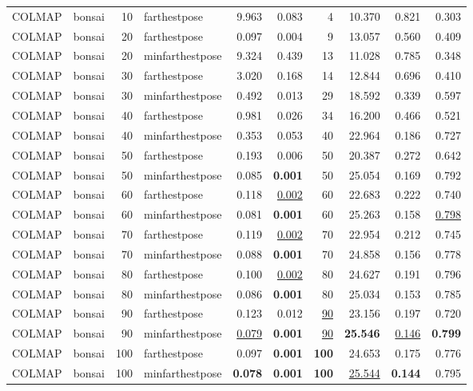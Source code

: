 \begin{table}[H]
\begin{tabular}{llrlrrrrrr}
\midrule
COLMAP & bonsai & 10 & farthestpose & 9.963 & 0.083 & 4 & 10.370 & 0.821 & 0.303 \\
COLMAP & bonsai & 20 & farthestpose & 0.097 & 0.004 & 9 & 13.057 & 0.560 & 0.409 \\
COLMAP & bonsai & 20 & minfarthestpose & 9.324 & 0.439 & 13 & 11.028 & 0.785 & 0.348 \\
COLMAP & bonsai & 30 & farthestpose & 3.020 & 0.168 & 14 & 12.844 & 0.696 & 0.410 \\
COLMAP & bonsai & 30 & minfarthestpose & 0.492 & 0.013 & 29 & 18.592 & 0.339 & 0.597 \\
COLMAP & bonsai & 40 & farthestpose & 0.981 & 0.026 & 34 & 16.200 & 0.466 & 0.521 \\
COLMAP & bonsai & 40 & minfarthestpose & 0.353 & 0.053 & 40 & 22.964 & 0.186 & 0.727 \\
COLMAP & bonsai & 50 & farthestpose & 0.193 & 0.006 & 50 & 20.387 & 0.272 & 0.642 \\
COLMAP & bonsai & 50 & minfarthestpose & 0.085 & \textbf{0.001} & 50 & 25.054 & 0.169 & 0.792 \\
COLMAP & bonsai & 60 & farthestpose & 0.118 & \underline{0.002} & 60 & 22.683 & 0.222 & 0.740 \\
COLMAP & bonsai & 60 & minfarthestpose & 0.081 & \textbf{0.001} & 60 & 25.263 & 0.158 & \underline{0.798} \\
COLMAP & bonsai & 70 & farthestpose & 0.119 & \underline{0.002} & 70 & 22.954 & 0.212 & 0.745 \\
COLMAP & bonsai & 70 & minfarthestpose & 0.088 & \textbf{0.001} & 70 & 24.858 & 0.156 & 0.778 \\
COLMAP & bonsai & 80 & farthestpose & 0.100 & \underline{0.002} & 80 & 24.627 & 0.191 & 0.796 \\
COLMAP & bonsai & 80 & minfarthestpose & 0.086 & \textbf{0.001} & 80 & 25.034 & 0.153 & 0.785 \\
COLMAP & bonsai & 90 & farthestpose & 0.123 & 0.012 & \underline{90} & 23.156 & 0.197 & 0.720 \\
COLMAP & bonsai & 90 & minfarthestpose & \underline{0.079} & \textbf{0.001} & \underline{90} & \textbf{25.546} & \underline{0.146} & \textbf{0.799} \\
COLMAP & bonsai & 100 & farthestpose & 0.097 & \textbf{0.001} & \textbf{100} & 24.653 & 0.175 & 0.776 \\
COLMAP & bonsai & 100 & minfarthestpose & \textbf{0.078} & \textbf{0.001} & \textbf{100} & \underline{25.544} & \textbf{0.144} & 0.795 \\

\end{tabular}
\end{table}

